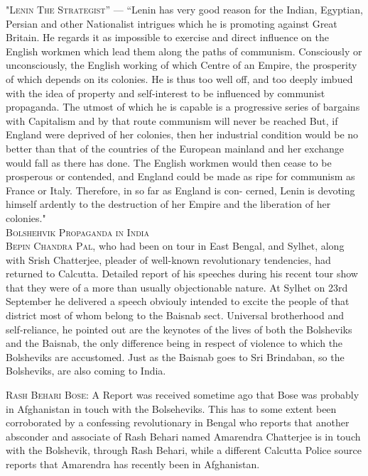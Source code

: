 \textsc{"Lenin The Strategist”} — “Lenin has very good reason for the Indian, Egyptian, Persian and other Nationalist intrigues which he is promoting against Great Britain. He regards it as impossible to exercise and direct influence on the English workmen which lead them along the paths of communism. Consciously or unconsciously, the English working of which Centre of an Empire, the prosperity of which depends on its colonies. He is thus too well off, and too deeply imbued with the idea of property and self-interest to be influenced by communist propaganda. The utmost of which he is capable is a progressive series of bargains with Capitalism and by that route communism will never be reached But, if England were deprived of her colonies, then her industrial condition would be no better than that of the countries of the European mainland and her exchange would fall as there has done. The English workmen would then cease to be prosperous or contended, and England could be made as ripe for communism as France or Italy. Therefore, in so far as England is con- cerned, Lenin is devoting himself ardently to the destruction of her Empire and the liberation of her colonies." \\

\textsc{Bolshehvik Propaganda in India }\\

\textsc{Bepin Chandra Pal}, who had been on tour in East Bengal, and Sylhet, along with Srish Chatterjee, pleader of well-known revolutionary tendencies, had returned to Calcutta. Detailed report of his speeches during his recent tour show that they were of a more than usually objectionable nature. At Sylhet on 23rd September he delivered a speech obviouly intended to excite the people of that district most of whom belong to the Baisnab sect. Universal brotherhood and self-reliance, he pointed out are the keynotes of the lives of both the Bolsheviks and the Baisnab, the only difference being in respect of violence to which the Bolsheviks are accustomed. Just as the Baisnab goes to Sri Brindaban, so the Bolsheviks, are also coming to India. 

\textsc{Rash Behari Bose:} A Report was received sometime ago that Bose was probably in Afghanistan in touch with the Bolseheviks. This has to some extent been corroborated by a confessing revolutionary in Bengal who reports that another absconder and associate of Rash Behari named Amarendra Chatterjee is in touch with the Bolshevik, through Rash Behari, while a different Calcutta Police source reports that Amarendra has recently been in Afghanistan. 

